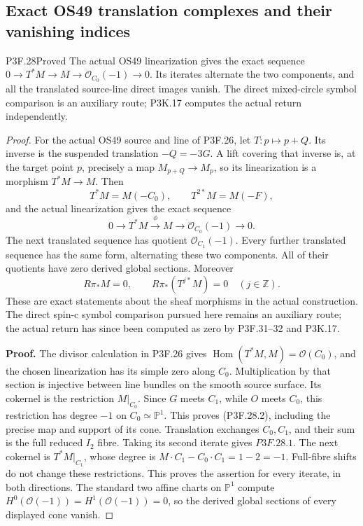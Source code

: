 \subsection{Exact OS49 translation complexes and their vanishing indices}
\begin{statement}{P3F.28}{Proved}
The actual OS49 linearization gives the exact sequence $0\to T^*M\to M\to\mathcal O_{C_0}(-1)\to0$. Its iterates alternate the two components, and all the translated source-line direct images vanish. The direct mixed-circle symbol comparison is an auxiliary route; P3K.17 computes the actual return independently.
\end{statement}
\begin{proof}
For the actual OS49 source and line of P3F.26, let \(T:p\mapsto p+Q\). Its inverse is the suspended translation \(-Q=-3G\). A lift covering that inverse is, at the target point \(p\), precisely a map \(M_{p+Q}\to M_p\), so its linearization is a morphism \(T^*M\to M\). Then \[
 T^*M=M(-C_0),\qquad T^{2*}M=M(-F),
                                                        \tag{P3F.28.1}
\] and the actual linearization gives the exact sequence \[
 0\longrightarrow T^*M\xrightarrow{\phi}M
       \longrightarrow\mathcal O_{C_0}(-1)
       \longrightarrow0.                              \tag{P3F.28.2}
\] The next translated sequence has quotient \(\mathcal O_{C_1}(-1)\). Every further translated sequence has the same form, alternating these two components. All of their quotients have zero derived global sections. Moreover \[
 R\pi_*M=0,
 \qquad R\pi_*(T^{j*}M)=0\quad(j\in\mathbb Z).          \tag{P3F.28.3}
\] These are exact statements about the sheaf morphisms in the actual construction. The direct spin-c symbol comparison pursued here remains an auxiliary route; the actual return has since been computed as zero by P3F.31--32 and P3K.17.

\textbf{Proof.} The divisor calculation in P3F.26 gives \(\operatorname{Hom}(T^*M,M)=\mathcal O(C_0)\), and the chosen linearization has its simple zero along \(C_0\). Multiplication by that section is injective between line bundles on the smooth source surface. Its cokernel is the restriction \(M|_{C_0}\). Since \(G\) meets \(C_1\), while \(O\) meets \(C_0\), this restriction has degree \(-1\) on \(C_0\simeq\mathbb P^1\). This proves (P3F.28.2), including the precise map and support of its cone. Translation exchanges \(C_0,C_1\), and their sum is the full reduced \(I_2\) fibre. Taking its second iterate gives \(P3F.28.1\). The next cokernel is \(T^*M|_{C_1}\), whose degree is \(M\cdot C_1-C_0\cdot C_1=1-2=-1\). Full-fibre shifts do not change these restrictions. This proves the assertion for every iterate, in both directions. The standard two affine charts on \(\mathbb P^1\) compute \(H^0(\mathcal O(-1))=H^1(\mathcal O(-1))=0\), so the derived global sections of every displayed cone vanish.


\end{proof}
